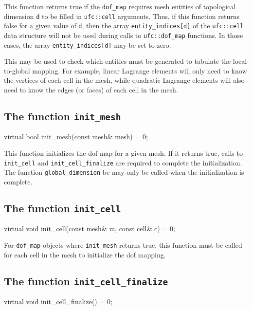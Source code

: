 This function returns true if the \texttt{dof\_map} requires mesh
entities of topological dimension \texttt{d} to be filled in
\texttt{ufc::cell} arguments. Thus, if this function returns false for
a given value of \texttt{d}, then the array
\texttt{entity\_indices[d]} of the \texttt{ufc::cell} data structure
will not be used during calls to \texttt{ufc::dof\_map} functions. In
those cases, the array \texttt{entity\_indices[d]} may be set to zero.

This may be used to check which entities
must be generated to tabulate the local-to-global mapping. For
example, linear Lagrange elements will only need to know the vertices
of each cell in the mesh, while quadratic Lagrange elements will also
need to know the edges (or faces) of each cell in the mesh.

\subsection{The function \texttt{init\_mesh}}

\begin{code}
virtual bool init_mesh(const mesh& mesh) = 0;
\end{code}

This function initializes the dof map for a given mesh. If it returns
true, calls to \texttt{init\_cell} and \texttt{init\_cell\_finalize}
are required to complete the initialization. The function
\texttt{global\_dimension} be may only be called when the
initialization is complete.

\subsection{The function \texttt{init\_cell}}

\begin{code}
virtual void init_cell(const mesh& m,
                       const cell& c) = 0;
\end{code}

For \texttt{dof\_map} objects where \texttt{init\_mesh} returns true,
this function must be called for each cell in the mesh to initialize
the dof mapping.

\subsection{The function \texttt{init\_cell\_finalize}}

\begin{code}
virtual void init_cell_finalize() = 0;
\end{code}


